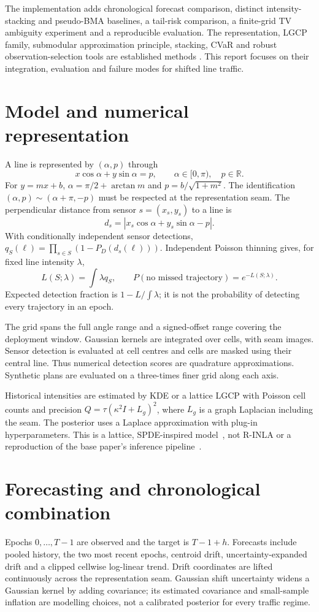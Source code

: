 \documentclass[11pt]{article}
\newcommand{\R}{\mathbb R}
\begin{document}
The implementation adds chronological forecast comparison, distinct
intensity-stacking and pseudo-BMA baselines, a tail-risk comparison, a
finite-grid TV ambiguity experiment and a reproducible evaluation. The
representation, LGCP family, submodular approximation principle, stacking,
CVaR and robust observation-selection tools are established methods
\cite{nemhauser1978,yao2018stacking,rockafellar2000,krause2008robust}.
This report focuses on their integration, evaluation and failure modes for shifted line traffic.

\section{Model and numerical representation}
A line is represented by $(\alpha,p)$ through
\[
x\cos\alpha+y\sin\alpha=p,\qquad \alpha\in[0,\pi),\quad p\in\R.
\]
For $y=mx+b$, $\alpha=\pi/2+\arctan m$ and
$p=b/\sqrt{1+m^2}$. The identification
$(\alpha,p)\sim(\alpha+\pi,-p)$ must be respected at the representation
seam. The perpendicular distance from sensor $s=(x_s,y_s)$ to a line is
\[
d_s=|x_s\cos\alpha+y_s\sin\alpha-p|.
\]
With conditionally independent sensor detections,
$q_S(\ell)=\prod_{s\in S}(1-P_D(d_s(\ell)))$. Independent Poisson thinning
gives, for fixed line intensity $\lambda$,
\begin{equation}
L(S;\lambda)=\int\lambda q_S,\qquad
P(\text{no missed trajectory})=e^{-L(S;\lambda)}.
\end{equation}
Expected detection fraction is $1-L/\int\lambda$; it is not the probability
of detecting every trajectory in an epoch.

The grid spans the full angle range and a signed-offset range covering
the deployment window. Gaussian kernels are integrated over cells, with
seam images. Sensor detection is evaluated at cell centres and cells are
masked using their central line. Thus numerical detection scores are
quadrature approximations. Synthetic plans are evaluated on a three-times
finer grid along each axis.

Historical intensities are estimated by KDE or a lattice LGCP with
Poisson cell counts and precision $Q=\tau(\kappa^2I+L_g)^2$, where $L_g$ is
a graph Laplacian including the seam. The posterior uses a Laplace
approximation with plug-in hyperparameters. This is a lattice,
SPDE-inspired model~\cite{lindgren2011}, not R-INLA or a reproduction of
the base paper's inference pipeline~\cite{rue2009inla}.

\section{Forecasting and chronological combination}
Epochs $0,\ldots,T-1$ are observed and the target is $T-1+h$. Forecasts
include pooled history, the two most recent epochs, centroid drift,
uncertainty-expanded drift and a clipped cellwise log-linear trend.
Drift coordinates are lifted continuously across the representation seam.
Gaussian shift uncertainty widens a Gaussian kernel by adding covariance;
its estimated covariance and small-sample inflation are modelling choices,
not a calibrated posterior for every traffic regime.
\end{document}
